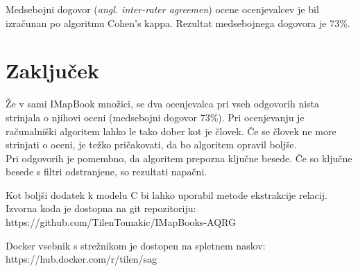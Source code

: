 \documentclass[journal]{IEEEtran}
\begin{document}
Medsebojni dogovor (\textit{angl. inter-rater agreemen}) ocene ocenjevalcev je bil izračunan po algoritmu Cohen's kappa. Rezultat medsebojnega dogovora je 73\%.

\section{Zaključek}
Že v sami IMapBook množici, se dva ocenjevalca pri vseh odgovorih nista strinjala o njihovi oceni (medsebojni dogovor 73\%). Pri ocenjevanju je računalniški algoritem lahko le tako dober kot je človek. Če se človek ne more strinjati o oceni, je težko pričakovati, da bo algoritem opravil boljše.\\

Pri odgovorih je pomembno, da algoritem prepozna ključne besede. Če so ključne besede s filtri odstranjene, so rezultati napačni.

Kot boljši dodatek k modelu C bi lahko uporabil metode ekstrakcije relacij.\\

Izvorna koda je dostopna na git repozitoriju: https://github.com/TilenTomakic/IMapBooks-AQRG

Docker vsebnik s strežnikom je dostopen na spletnem naslov:
https://hub.docker.com/r/tilen/sag

\ifCLASSOPTIONcaptionsoff
  \newpage
\fi



\end{document}
